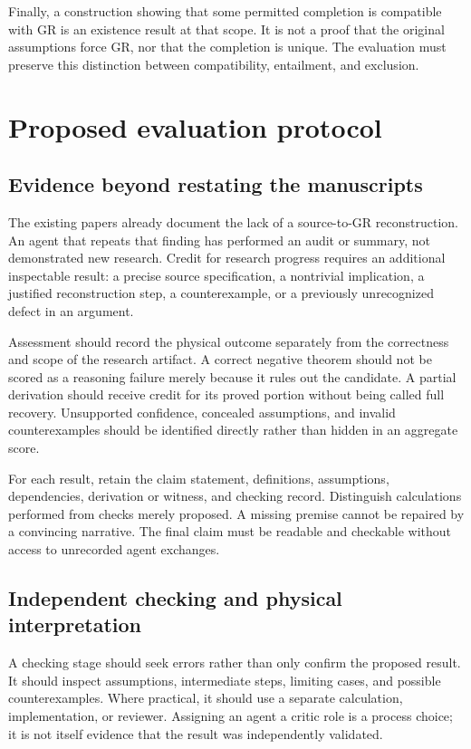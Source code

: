 \documentclass[11pt,oneside]{report}
\theoremstyle{remark}
\numberwithin{definition}{chapter}
\numberwithin{proposition}{chapter}
\numberwithin{remark}{chapter}
\begin{document}
Finally, a construction showing that some permitted completion is compatible with GR is an existence result at that scope. It is not a proof that the original assumptions force GR, nor that the completion is unique. The evaluation must preserve this distinction between compatibility, entailment, and exclusion.

\section{Proposed evaluation protocol}
\subsection{Evidence beyond restating the manuscripts}
The existing papers already document the lack of a source-to-GR reconstruction. An agent that repeats that finding has performed an audit or summary, not demonstrated new research. Credit for research progress requires an additional inspectable result: a precise source specification, a nontrivial implication, a justified reconstruction step, a counterexample, or a previously unrecognized defect in an argument.

Assessment should record the physical outcome separately from the correctness and scope of the research artifact. A correct negative theorem should not be scored as a reasoning failure merely because it rules out the candidate. A partial derivation should receive credit for its proved portion without being called full recovery. Unsupported confidence, concealed assumptions, and invalid counterexamples should be identified directly rather than hidden in an aggregate score.

For each result, retain the claim statement, definitions, assumptions, dependencies, derivation or witness, and checking record. Distinguish calculations performed from checks merely proposed. A missing premise cannot be repaired by a convincing narrative. The final claim must be readable and checkable without access to unrecorded agent exchanges.

\subsection{Independent checking and physical interpretation}
A checking stage should seek errors rather than only confirm the proposed result. It should inspect assumptions, intermediate steps, limiting cases, and possible counterexamples. Where practical, it should use a separate calculation, implementation, or reviewer. Assigning an agent a critic role is a process choice; it is not itself evidence that the result was independently validated.
\end{document}
